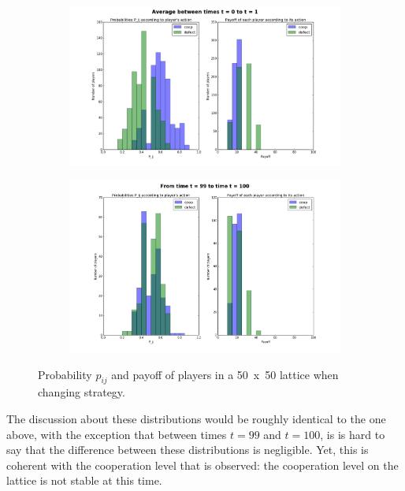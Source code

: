 \documentclass{article}
\begin{document}
\begin{figure}
	\begin{subfigure}{\textwidth}
		\includegraphics[width=\textwidth]{imgs/part2_diff_coop_defect_0_to_1_VN.png}
	\end{subfigure}
	\begin{subfigure}{\textwidth}
		\includegraphics[width=\textwidth]{imgs/part2_diff_coop_defect_99_to_100_VN.png}
	\end{subfigure}
	\caption{Probability $p_{ij}$ and payoff of players in a 50~x~50 lattice when changing strategy.\label{fig:9}}
\end{figure}

The discussion about these distributions would be roughly identical to the one above, with the exception that
between times $t=99$ and $t=100$, is is hard to say that the difference between these distributions is negligible.
Yet, this is coherent with the cooperation level that is observed: the cooperation level on the lattice is
not stable at this time.
\end{document}
